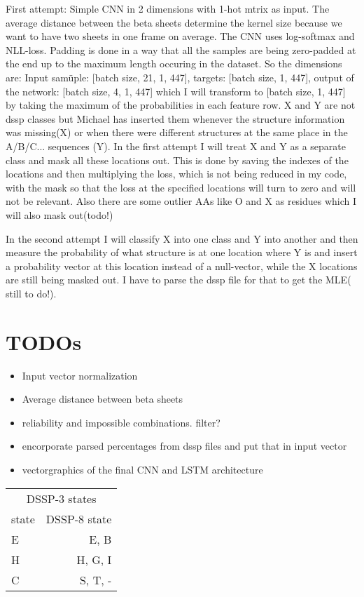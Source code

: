 \documentclass{article}
\begin{document}
First attempt: Simple CNN in 2 dimensions with 1-hot mtrix as input. The average distance between the beta sheets determine the kernel size because we want to have two sheets in one frame on average. The CNN uses log-softmax and NLL-loss. Padding is done in a way that all the samples are being zero-padded at the end up to the maximum length occuring in the dataset. So the dimensions are:
Input samüple: [batch size, 21, 1, 447], targets: [batch size, 1, 447], output of the network: [batch size, 4, 1, 447] which I will transform to [batch size, 1, 447] by taking the maximum of the probabilities in each feature row.
X and Y are not dssp classes but Michael has inserted them whenever the structure information was missing(X) or when there were different structures at the same place in the A/B/C... sequences (Y). 
In the first attempt I will treat X and Y as a separate class and mask all these locations out. This is done by saving the indexes of the locations and then multiplying the loss, which is not being reduced in my code, with the mask so that the loss at the specified locations will turn to zero and will not be relevant. Also there are some outlier AAs like O and X as residues which I will also mask out(todo!)

In the second attempt I will classify X into one class and Y into another and then measure the probability of what structure is at one location where Y is and insert a probability vector at this location instead of a null-vector, while the X locations are still being masked out. I have to parse the dssp file for that to get the MLE( still to do!). 

\section{TODOs}
\begin{itemize}
\item Input vector normalization
\item Average distance between beta sheets
\item reliability and impossible combinations. filter?
\item encorporate parsed percentages from dssp files and put that in input vector
\item vectorgraphics of the final CNN and LSTM architecture 
\end{itemize}


\begin{tabular}{lr}
\hline
\multicolumn{2}{c}{DSSP-3 states} \\
\cline{1-2}
state    & DSSP-8 state  \\
\hline
E       & E, B\\
H      & H, G, I\\
C      & S, T, -\\

\hline
\end{tabular}
\\
\\
\end{document}
